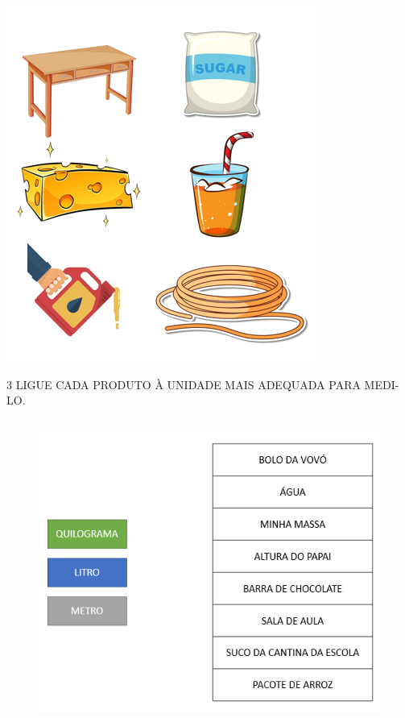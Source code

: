 \begin{minipage}{.5\textwidth}
\includegraphics[width=\textwidth]{media/image24.png}
\end{minipage}\hspace{.5cm}

\pagebreak
\num{3} LIGUE CADA PRODUTO À UNIDADE MAIS ADEQUADA PARA MEDI-LO.


\begin{figure}[htpb!]
\centering
\includegraphics[width=4.86920in,height=3.96016in]{media/image25.png}
\end{figure}


